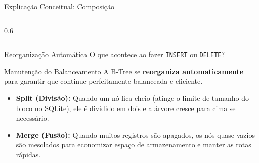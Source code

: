 \documentclass[9pt]{beamer}
\begin{document}
\begin{frame}[fragile]{Explicação Conceitual: Composição}
\begin{columns}
\begin{column}{0.6\textwidth}
\begin{center}
            \end{center}
        \end{column}
    \end{columns}
\end{frame}

\begin{frame}{Reorganização Automática}
    O que acontece ao fazer \texttt{INSERT} ou \texttt{DELETE}?
    
    \vspace{0.3cm}
    \begin{block}{Manutenção do Balanceamento}
        A B-Tree se \textbf{reorganiza automaticamente} para garantir que continue perfeitamente balanceada e eficiente.
    \end{block}
    
    \vspace{0.3cm}
    \begin{itemize}
        \item \textbf{Split (Divisão):} Quando um nó fica cheio (atinge o limite de tamanho do bloco no SQLite), ele é dividido em dois e a árvore cresce para cima se necessário.
        \item \textbf{Merge (Fusão):} Quando muitos registros são apagados, os nós quase vazios são mesclados para economizar espaço de armazenamento e manter as rotas rápidas.
    \end{itemize}
\end{frame}
\end{document}
